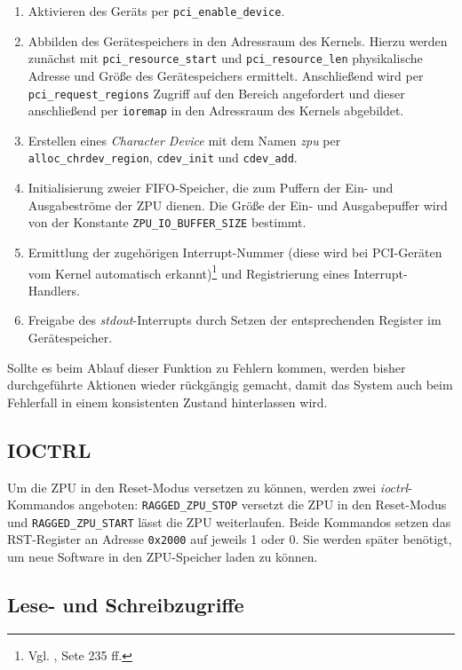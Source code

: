 \documentclass[11pt]{scrartcl}
\begin{document}
\begin{enumerate}
	\item Aktivieren des Geräts per \texttt{pci\_enable\_device}.
	\item Abbilden des Gerätespeichers in den Adressraum des Kernels. Hierzu werden zunächst mit \texttt{pci\_resource\_start} und \texttt{pci\_resource\_len} physikalische Adresse und Größe des Gerätespeichers ermittelt. Anschließend wird per \texttt{pci\_request\_regions} Zugriff auf den Bereich angefordert und dieser anschließend per \texttt{ioremap} in den Adressraum des Kernels abgebildet.
	\item Erstellen eines \textit{Character Device} mit dem Namen \textit{zpu} per \texttt{alloc\_chrdev\_region}, \texttt{cdev\_init} und \texttt{cdev\_add}.
	\item Initialisierung zweier FIFO-Speicher, die zum Puffern der Ein- und Ausgabeströme der ZPU dienen. Die Größe der Ein- und Ausgabepuffer wird von der Konstante \texttt{ZPU\_IO\_BUFFER\_SIZE} bestimmt.
	\item Ermittlung der zugehörigen Interrupt-Nummer (diese wird bei PCI-Geräten vom Kernel automatisch erkannt)\footnote{Vgl. \cite{script_hwstp}, Sete 235 ff.} und Registrierung eines Interrupt-Handlers.
	\item Freigabe des \textit{stdout}-Interrupts durch Setzen der entsprechenden Register im Gerätespeicher.
\end{enumerate}

Sollte es beim Ablauf dieser Funktion zu Fehlern kommen, werden bisher durchgeführte Aktionen wieder rückgängig gemacht, damit das System auch beim Fehlerfall in einem konsistenten Zustand hinterlassen wird.

\subsection{IOCTRL}

Um die ZPU in den Reset-Modus versetzen zu können, werden zwei \textit{ioctrl}-Kommandos angeboten: \texttt{RAGGED\_ZPU\_STOP} versetzt die ZPU in den Reset-Modus und \texttt{RAGGED\_ZPU\_START} lässt die ZPU weiterlaufen. Beide Kommandos setzen das RST-Register an Adresse \texttt{0x2000} auf jeweils 1 oder 0. Sie werden später benötigt, um neue Software in den ZPU-Speicher laden zu können.

\subsection{Lese- und Schreibzugriffe}
\end{document}
